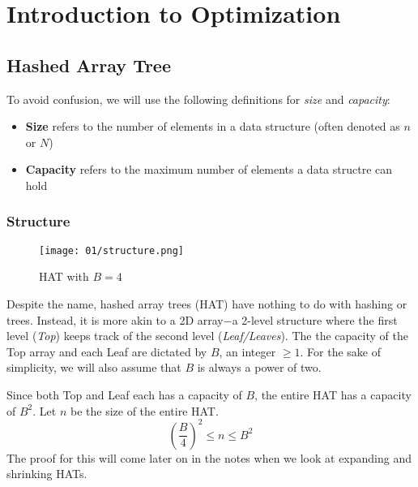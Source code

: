 \chapter{Introduction to Optimization}

\section{Hashed Array Tree}

\begin{tcolorbox}[title=Terminology]
	To avoid confusion, we will use the following definitions for \textit{size} and \textit{capacity}:
	\begin{itemize}
		\item \textbf{Size} refers to the number of elements in a data structure (often denoted as $n$ or $N$)
		\item \textbf{Capacity} refers to the maximum number of elements a data structre can hold
	\end{itemize}
\end{tcolorbox}

\subsection*{Structure}

\begingroup

\begin{wrapfigure}{l}{0.4\textwidth}
	\centering
	\texttt{[image: 01/structure.png]}
    \caption{HAT with $B=4$}\label{hashed-tree-diagram}
\end{wrapfigure}
Despite the name, hashed array trees (HAT) have nothing to do with hashing or trees. Instead, it is more
akin to a 2D array$-$a 2-level structure where the first level (\textit{Top}) keeps track of the 
second level (\textit{Leaf/Leaves}). The the capacity of the Top array and each Leaf are dictated
by $B$, an integer $\geq1$. For the sake of simplicity, we will also assume that $B$ is always
a power of two.

Since both Top and Leaf each has a capacity of $B$, the entire HAT has a capacity of $B^2$.
Let $n$ be the size of the entire HAT.
\begin{equation}\label{hat-invariant}
	\left(\frac{B}{4}\right)^2 \leq n \leq B^2
\end{equation}
The proof for this will come later on in the notes when we look at expanding and shrinking HATs.

\endgroup

